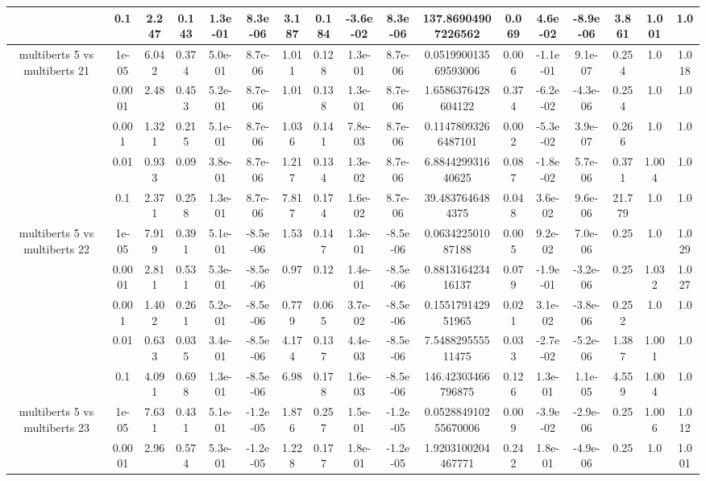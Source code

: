 \begin{tabular}{|c|c|c|c|c|c|c|c|c|c|c|c|c|c|c|c|c|}
 & 0.1 & 2.247 & 0.143 & 1.3e-01 & 8.3e-06 & 3.187 & 0.184 & -3.6e-02 & 8.3e-06 & 137.86904907226562 & 0.069 & 4.6e-02 & -8.9e-06 & 3.861 & 1.001 & 1.0 \\
\hline
\multirow{5}{*}{multiberts 5 vs multiberts 21} & 1e-05 & 6.042 & 0.374 & 5.0e-01 & 8.7e-06 & 1.011 & 0.128 & 1.3e-01 & 8.7e-06 & 0.051990013569593006 & 0.006 & -1.1e-01 & 9.1e-07 & 0.254 & 1.0 & 1.018 \\
 & 0.0001 & 2.48 & 0.453 & 5.2e-01 & 8.7e-06 & 1.01 & 0.138 & 1.3e-01 & 8.7e-06 & 1.6586376428604122 & 0.374 & -6.2e-02 & -4.3e-06 & 0.254 & 1.0 & 1.0 \\
 & 0.001 & 1.321 & 0.215 & 5.1e-01 & 8.7e-06 & 1.036 & 0.141 & 7.8e-03 & 8.7e-06 & 0.11478093266487101 & 0.002 & -5.3e-02 & 3.9e-07 & 0.266 & 1.0 & 1.0 \\
 & 0.01 & 0.933 & 0.09 & 3.8e-01 & 8.7e-06 & 1.217 & 0.134 & 1.3e-02 & 8.7e-06 & 6.884429931640625 & 0.087 & -1.8e-02 & 5.7e-06 & 0.371 & 1.004 & 1.0 \\
 & 0.1 & 2.371 & 0.258 & 1.3e-01 & 8.7e-06 & 7.817 & 0.174 & 1.6e-02 & 8.7e-06 & 39.4837646484375 & 0.048 & 3.6e-02 & 9.6e-06 & 21.779 & 1.0 & 1.0 \\
\hline
\multirow{5}{*}{multiberts 5 vs multiberts 22} & 1e-05 & 7.919 & 0.391 & 5.1e-01 & -8.5e-06 & 1.53 & 0.147 & 1.3e-01 & -8.5e-06 & 0.063422501087188 & 0.005 & 9.2e-02 & 7.0e-06 & 0.25 & 1.0 & 1.029 \\
 & 0.0001 & 2.811 & 0.531 & 5.3e-01 & -8.5e-06 & 0.97 & 0.12 & 1.4e-01 & -8.5e-06 & 0.881316423416137 & 0.079 & -1.9e-01 & -3.2e-06 & 0.25 & 1.032 & 1.027 \\
 & 0.001 & 1.402 & 0.261 & 5.2e-01 & -8.5e-06 & 0.779 & 0.065 & 3.7e-02 & -8.5e-06 & 0.155179142951965 & 0.021 & 3.1e-02 & -3.8e-06 & 0.252 & 1.0 & 1.0 \\
 & 0.01 & 0.633 & 0.035 & 3.4e-01 & -8.5e-06 & 4.174 & 0.137 & 4.4e-03 & -8.5e-06 & 7.548829555511475 & 0.033 & -2.7e-02 & -5.2e-06 & 1.387 & 1.001 & 1.0 \\
 & 0.1 & 4.091 & 0.698 & 1.3e-01 & -8.5e-06 & 6.98 & 0.178 & 1.6e-03 & -8.5e-06 & 146.42303466796875 & 0.126 & 1.3e-01 & 1.1e-05 & 4.559 & 1.004 & 1.0 \\
\hline
\multirow{5}{*}{multiberts 5 vs multiberts 23} & 1e-05 & 7.631 & 0.431 & 5.1e-01 & -1.2e-05 & 1.876 & 0.257 & 1.5e-01 & -1.2e-05 & 0.052884910255670006 & 0.009 & -3.9e-02 & -2.9e-06 & 0.25 & 1.006 & 1.012 \\
 & 0.0001 & 2.96 & 0.574 & 5.3e-01 & -1.2e-05 & 1.228 & 0.177 & 1.8e-01 & -1.2e-05 & 1.9203100204467771 & 0.242 & 1.8e-01 & -4.9e-06 & 0.25 & 1.0 & 1.001 \\

\end{tabular}
